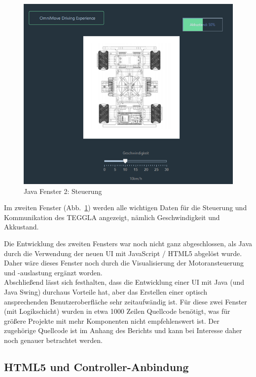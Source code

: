 \begin{figure}[!ht]
	\centering
	\includegraphics[width=\textwidth]{bilder/java1.png}
	\caption{Java Fenster 2: Steuerung}
	\label{bild:java2}
\end{figure}

Im zweiten Fenster (Abb.~\ref{bild:java2}) werden alle wichtigen Daten für die Steuerung
und Kommunikation des TEGGLA angezeigt, nämlich Geschwindigkeit und Akkustand.

Die Entwicklung des zweiten Fensters war noch nicht ganz abgeschlossen, als Java
durch die Verwendung der neuen UI mit JavaScript / HTML5 abgelöst wurde. Daher
wäre dieses Fenster noch durch die Visualisierung der Motoransteuerung und -auslastung ergänzt worden.\\

Abschließend lässt sich festhalten, dass die Entwicklung einer UI mit Java (und Java Swing) durchaus Vorteile hat, aber das Erstellen einer optisch ansprechenden Benutzeroberfläche sehr zeitaufwändig ist. 
Für diese zwei Fenster (mit Logikschicht) wurden in etwa 1000 Zeilen Quellcode benötigt, was für größere Projekte mit mehr Komponenten nicht empfehlenswert ist. 
Der zugehörige Quellcode ist im Anhang des Berichts und kann bei Interesse daher noch genauer betrachtet werden.



\subsection{HTML5 und Controller-Anbindung}

